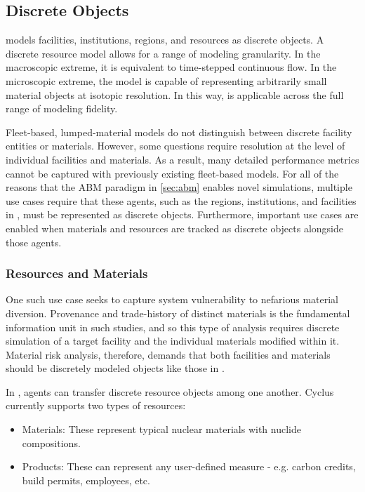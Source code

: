 \subsection{Discrete Objects}

\Cyclus models facilities, institutions, regions, and resources as discrete
objects. A discrete resource model allows for a range of modeling granularity. In the
macroscopic extreme, it is equivalent to time-stepped continuous flow. In the
microscopic extreme, the model is capable of representing arbitrarily small
material objects at isotopic resolution. In this way, \Cyclus is
applicable across the full range of modeling fidelity.

Fleet-based, lumped-material models do not distinguish between discrete facility
entities or materials. However, some questions require resolution at the level
of individual facilities and materials.  As a result, many detailed performance
metrics cannot be captured with previously existing fleet-based models. For all
of the reasons that the \gls{ABM} paradigm in \ref{sec:abm} enables novel
simulations, multiple use cases require that these agents, such as the regions,
institutions, and facilities in \Cyclus, must be represented as discrete
objects. Furthermore, important use cases are enabled when materials and
resources are tracked as discrete objects alongside those agents.

\subsubsection{Resources and Materials}

One such use case seeks to capture system vulnerability to nefarious
material diversion. Provenance and trade-history of distinct materials is the fundamental
information unit in such studies, and so this type of analysis requires
 discrete simulation of a
target facility and the individual materials modified within it.
Material risk analysis, therefore, demands that both facilities and materials
should be discretely modeled objects like those in \Cyclus.


In \Cyclus, agents can transfer discrete resource objects among one another.
Cyclus currently supports two types of resources:

\begin{itemize}

  \item Materials: These represent typical nuclear materials with
      nuclide compositions.

  \item Products: These can represent any user-defined measure - e.g. carbon
      credits, build permits, employees, etc.

\end{itemize}

